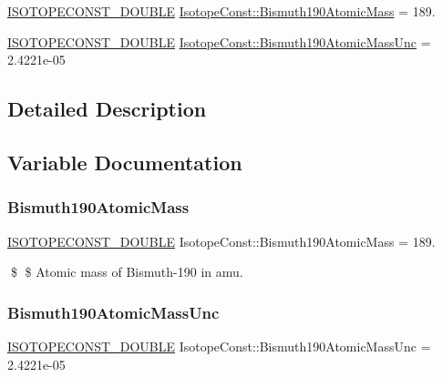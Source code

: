 \begin{DoxyCompactItemize}
\item 
\mbox{\hyperlink{group___isotope_const-_macros_ga8f45a7272ce02c0b4c65c44636ed719a}{I\+S\+O\+T\+O\+P\+E\+C\+O\+N\+S\+T\+\_\+\+D\+O\+U\+B\+LE}} \mbox{\hyperlink{group___isotope_const-_bismuth-_bi190_ga31821c979476c34a8121ad77240606e2}{Isotope\+Const\+::\+Bismuth190\+Atomic\+Mass}} = 189.
\item 
\mbox{\hyperlink{group___isotope_const-_macros_ga8f45a7272ce02c0b4c65c44636ed719a}{I\+S\+O\+T\+O\+P\+E\+C\+O\+N\+S\+T\+\_\+\+D\+O\+U\+B\+LE}} \mbox{\hyperlink{group___isotope_const-_bismuth-_bi190_ga525b5233fad86a446bbca9d7c942c478}{Isotope\+Const\+::\+Bismuth190\+Atomic\+Mass\+Unc}} = 2.\+4221e-\/05
\end{DoxyCompactItemize}


\subsection{Detailed Description}


\subsection{Variable Documentation}
\mbox{\label{group___isotope_const-_bismuth-_bi190_ga31821c979476c34a8121ad77240606e2}} 
\subsubsection{\texorpdfstring{Bismuth190\+Atomic\+Mass}{Bismuth190AtomicMass}}
{\footnotesize\ttfamily \mbox{\hyperlink{group___isotope_const-_macros_ga8f45a7272ce02c0b4c65c44636ed719a}{I\+S\+O\+T\+O\+P\+E\+C\+O\+N\+S\+T\+\_\+\+D\+O\+U\+B\+LE}} Isotope\+Const\+::\+Bismuth190\+Atomic\+Mass = 189.}

\$ \$ Atomic mass of Bismuth-\/190 in amu. \mbox{\label{group___isotope_const-_bismuth-_bi190_ga525b5233fad86a446bbca9d7c942c478}} 
\subsubsection{\texorpdfstring{Bismuth190\+Atomic\+Mass\+Unc}{Bismuth190AtomicMassUnc}}
{\footnotesize\ttfamily \mbox{\hyperlink{group___isotope_const-_macros_ga8f45a7272ce02c0b4c65c44636ed719a}{I\+S\+O\+T\+O\+P\+E\+C\+O\+N\+S\+T\+\_\+\+D\+O\+U\+B\+LE}} Isotope\+Const\+::\+Bismuth190\+Atomic\+Mass\+Unc = 2.\+4221e-\/05}

